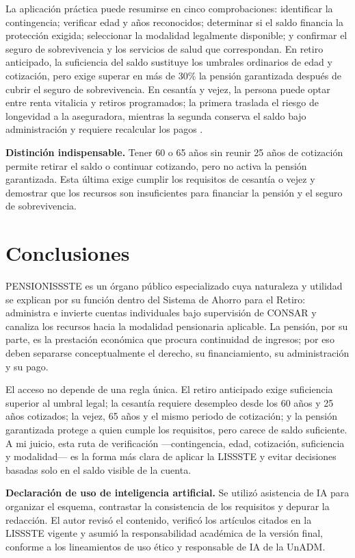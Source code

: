 \documentclass[11pt,letterpaper,oneside]{article}
\begin{document}
La aplicación práctica puede resumirse en cinco comprobaciones: identificar la contingencia; verificar edad y años reconocidos; determinar si el saldo financia la protección exigida; seleccionar la modalidad legalmente disponible; y confirmar el seguro de sobrevivencia y los servicios de salud que correspondan. En retiro anticipado, la suficiencia del saldo sustituye los umbrales ordinarios de edad y cotización, pero exige superar en más de 30\% la pensión garantizada después de cubrir el seguro de sobrevivencia. En cesantía y vejez, la persona puede optar entre renta vitalicia y retiros programados; la primera traslada el riesgo de longevidad a la aseguradora, mientras la segunda conserva el saldo bajo administración y requiere recalcular los pagos \citep[arts.~80, 81, 87 y 91]{lissste2026}.

\begin{center}
\setlength{\fboxsep}{8pt}
\colorbox{unadmSand}{\begin{minipage}{0.88\linewidth}
\textbf{Distinción indispensable.} Tener 60 o 65 años sin reunir 25 años de cotización permite retirar el saldo o continuar cotizando, pero no activa la pensión garantizada. Esta última exige cumplir los requisitos de cesantía o vejez y demostrar que los recursos son insuficientes para financiar la pensión y el seguro de sobrevivencia.
\end{minipage}}
\end{center}

\section{Conclusiones}

PENSIONISSSTE es un órgano público especializado cuya naturaleza y utilidad se explican por su función dentro del Sistema de Ahorro para el Retiro: administra e invierte cuentas individuales bajo supervisión de CONSAR y canaliza los recursos hacia la modalidad pensionaria aplicable. La pensión, por su parte, es la prestación económica que procura continuidad de ingresos; por eso deben separarse conceptualmente el derecho, su financiamiento, su administración y su pago.

El acceso no depende de una regla única. El retiro anticipado exige suficiencia superior al umbral legal; la cesantía requiere desempleo desde los 60 años y 25 años cotizados; la vejez, 65 años y el mismo periodo de cotización; y la pensión garantizada protege a quien cumple los requisitos, pero carece de saldo suficiente. A mi juicio, esta ruta de verificación ---contingencia, edad, cotización, suficiencia y modalidad--- es la forma más clara de aplicar la LISSSTE y evitar decisiones basadas solo en el saldo visible de la cuenta.

\textbf{Declaración de uso de inteligencia artificial.} Se utilizó asistencia de IA para organizar el esquema, contrastar la consistencia de los requisitos y depurar la redacción. El autor revisó el contenido, verificó los artículos citados en la LISSSTE vigente y asumió la responsabilidad académica de la versión final, conforme a los lineamientos de uso ético y responsable de IA de la UnADM.

\nocite{bricenoRuiz2011,carrilloCastroIssste,lissste2026,materialS8DSS2026}

\end{document}
